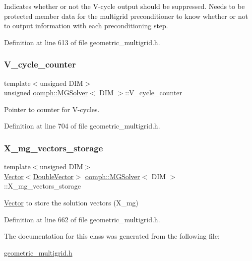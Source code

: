 Indicates whether or not the V-\/cycle output should be suppressed. Needs to be protected member data for the multigrid preconditioner to know whether or not to output information with each preconditioning step. 



Definition at line 613 of file geometric\+\_\+multigrid.\+h.

\mbox{\label{classoomph_1_1MGSolver_a29bdc90613e9759bd3fdff47a0c7c45a}} 
\subsubsection{\texorpdfstring{V\+\_\+cycle\+\_\+counter}{V\_cycle\_counter}}
{\footnotesize\ttfamily template$<$unsigned D\+IM$>$ \\
unsigned \hyperlink{classoomph_1_1MGSolver}{oomph\+::\+M\+G\+Solver}$<$ D\+IM $>$\+::V\+\_\+cycle\+\_\+counter\hspace{0.3cm}{\ttfamily [private]}}



Pointer to counter for V-\/cycles. 



Definition at line 704 of file geometric\+\_\+multigrid.\+h.

\mbox{\label{classoomph_1_1MGSolver_ad0117f918473d50a9ca8526103401534}} 
\subsubsection{\texorpdfstring{X\+\_\+mg\+\_\+vectors\+\_\+storage}{X\_mg\_vectors\_storage}}
{\footnotesize\ttfamily template$<$unsigned D\+IM$>$ \\
\hyperlink{classoomph_1_1Vector}{Vector}$<$\hyperlink{classoomph_1_1DoubleVector}{Double\+Vector}$>$ \hyperlink{classoomph_1_1MGSolver}{oomph\+::\+M\+G\+Solver}$<$ D\+IM $>$\+::X\+\_\+mg\+\_\+vectors\+\_\+storage\hspace{0.3cm}{\ttfamily [private]}}



\hyperlink{classoomph_1_1Vector}{Vector} to store the solution vectors (X\+\_\+mg) 



Definition at line 662 of file geometric\+\_\+multigrid.\+h.



The documentation for this class was generated from the following file\+:\begin{DoxyCompactItemize}
\item 
\hyperlink{geometric__multigrid_8h}{geometric\+\_\+multigrid.\+h}\end{DoxyCompactItemize}
